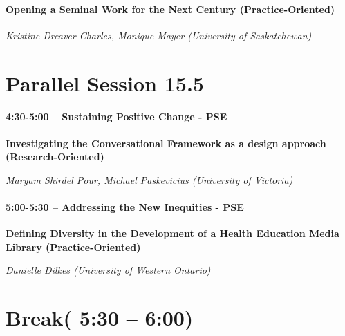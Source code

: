\documentclass[
]{book}
\begin{document}
\begin{secondary}
\hypertarget{opening-a-seminal-work-for-the-next-century-practice-oriented}{%
\paragraph{Opening a Seminal Work for the Next Century
(Practice-Oriented)}\label{opening-a-seminal-work-for-the-next-century-practice-oriented}}

\emph{Kristine Dreaver-Charles, Monique Mayer (University of
Saskatchewan)}
\end{secondary}

\hypertarget{parallel-session-15.5}{%
\section*{Parallel Session 15.5}\label{parallel-session-15.5}}

\begin{secondary}
\hypertarget{sustaining-positive-change---pse}{%
\paragraph{4:30-5:00 -- Sustaining Positive Change -
PSE}\label{sustaining-positive-change---pse}}

\textbf{Investigating the Conversational Framework as a design approach
(Research-Oriented)}

\emph{Maryam Shirdel Pour, Michael Paskevicius (University of Victoria)}
\end{secondary}

\begin{secondary}
\hypertarget{addressing-the-new-inequities---pse}{%
\paragraph{5:00-5:30 -- Addressing the New Inequities -
PSE}\label{addressing-the-new-inequities---pse}}

\textbf{Defining Diversity in the Development of a Health Education
Media Library (Practice-Oriented)}

\emph{Danielle Dilkes (University of Western Ontario)}
\end{secondary}

\hypertarget{break-530-600-2}{%
\section*{Break( 5:30 -- 6:00)}\label{break-530-600-2}}
\end{document}
